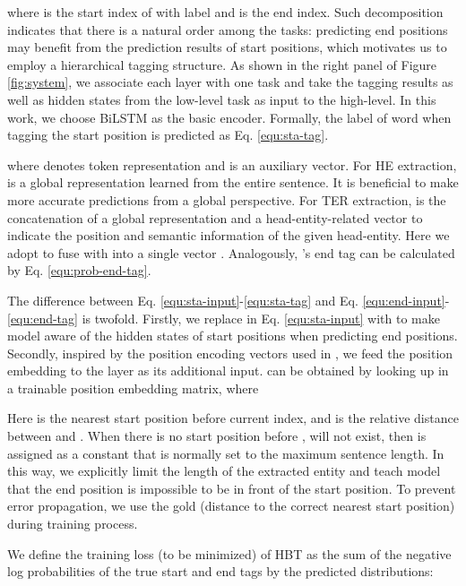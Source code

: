 \documentclass{ecai}
\begin{document}
where  is the start index of  with label  and  is the end index. 
Such decomposition indicates that there is a natural order among the tasks: predicting end positions may benefit from the prediction results of start positions, which motivates us to employ a hierarchical tagging structure.
As shown in the right panel of Figure \ref{fig:system}, we associate each layer with one task and take the tagging results as well as hidden states from the low-level task as input to the high-level. 
In this work, we choose BiLSTM \cite{hochreiter1997long} as the basic encoder.
Formally, the label of word  when tagging the start position is predicted as Eq. \ref{equ:sta-tag}.






\noindent where  denotes token representation and  is an auxiliary vector. 
For HE extraction,  is a global representation learned from the entire sentence. 
It is beneficial to make more accurate predictions from a global perspective. 
For TER extraction,  is the concatenation of a global representation and a head-entity-related vector to indicate the position and semantic information of the given head-entity.  
Here we adopt  to fuse  with  into a single vector . 
Analogously, 's end tag can be calculated by Eq. \ref{equ:prob-end-tag}.




The difference between Eq. \ref{equ:sta-input}-\ref{equ:sta-tag} and Eq. \ref{equ:end-input}-\ref{equ:end-tag} is twofold. 
Firstly, we replace   in Eq. \ref{equ:sta-input} with   to make model aware of the hidden states of start positions when predicting end positions. 
Secondly, inspired by the position encoding vectors used in \cite{zeng2014relation}, we feed the position embedding  to the  layer as its additional input. 
 can be obtained by looking up  in a trainable position embedding matrix, where 


Here  is the nearest start position before current index, and  is the relative distance between  and . 
When there is no start position before ,  will not exist, then  is assigned as a constant  that is normally set to the maximum sentence length. 
In this way, we explicitly limit the length of the extracted entity and teach model that the end position is impossible to be in front of the start position. 
To prevent error propagation, we use the gold  (distance to the correct nearest start position) during training process.

We define the training loss (to be minimized) of HBT as the sum of the negative log probabilities of the true start and end tags by the predicted distributions:
\end{document}
